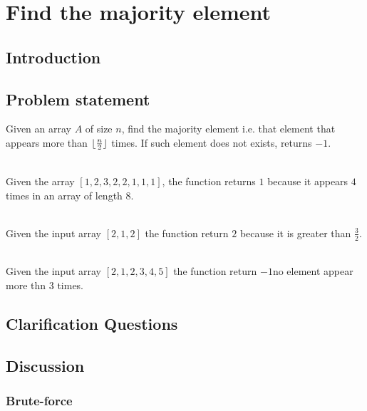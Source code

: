 %

\chapter{Find the majority element}
\label{ch:majority_element}
\section*{Introduction}

\section{Problem statement}
\begin{exercise}
Given an array $A$ of size $n$, find the majority element i.e. that element that appears more than $\lfloor\frac{n}{2}\rfloor$ times.
If such element does not exists, returns $-1$.
	\begin{example}
		\hfill \\
		Given the array $[1,2,3,2,2,1,1,1]$, the function returns $1$ because it appears $4$ times in an array of length $8$.
	
	\end{example}

	\begin{example}
		\hfill \\
		Given the input array $[2, 1, 2]$ the function return $2$ because it is greater than $\frac{3}{2}$.
		
	\end{example}

	\begin{example}
		\hfill \\
		Given the input array $[2, 1, 2,3,4,5]$ the function return $-1$no element appear more thn $3$ times.
		
	\end{example}

\end{exercise}

\section{Clarification Questions}

\begin{QandA}
	\item 
	\begin{answered}
		\textit{}
	\end{answered}
	
\end{QandA}

\section{Discussion}
\label{majority_element:sec:discussion}


\subsection{Brute-force}
\label{majority_element:sec:bruteforce}



